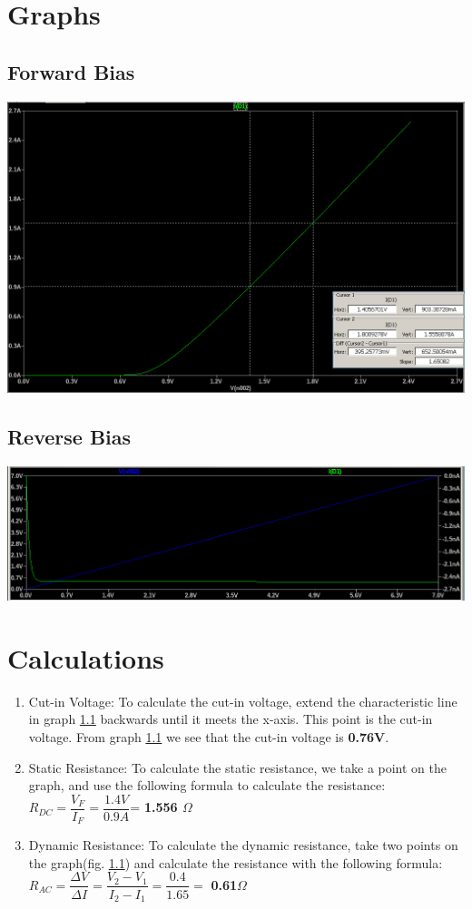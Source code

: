 \documentclass{article}
\begin{document}
	\section{Graphs}
	\subsection{Forward Bias}
		\label{graph:fwd-bias}
		\includegraphics[width=1\linewidth]{"forward bias graph"}
	\subsection{Reverse Bias}
		\label{graph:rev-bias}
		\includegraphics[width=1\linewidth]{"reverse bias graph"}
		
	\section{Calculations}
	\begin{enumerate}
		\item Cut-in Voltage: To calculate the cut-in voltage, extend the characteristic line in graph \ref{graph:fwd-bias} backwards until it meets the x-axis. This point is the cut-in voltage. From graph \ref{graph:fwd-bias} we see that the cut-in voltage is \textbf{0.76V}.
		\item Static Resistance: To calculate the static resistance, we take a point on the graph, and use the following formula to calculate the resistance: \\ $ R_{DC}  =\dfrac{V_F}{I_F} = \dfrac{1.4V}{0.9A}$= \textbf{1.556 $ \Omega $}
		\item Dynamic Resistance: To calculate the dynamic resistance, take two points on the graph(fig. \ref{graph:fwd-bias}) and calculate the resistance with the following formula: \\ $ R_{AC} = \dfrac{\Delta V}{\Delta I}  = \dfrac{V_2 - V_1}{I_2 - I_1} = \dfrac{0.4}{1.65}  = $ \textbf{0.61$ \Omega $} \\
	\end{enumerate}
	
\end{document}
